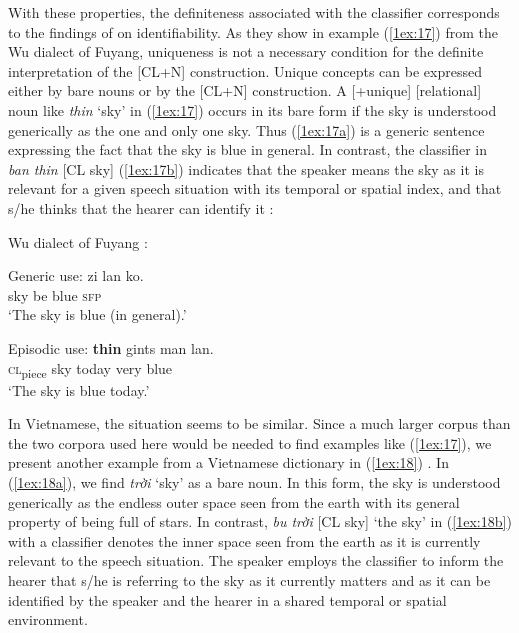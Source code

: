 \documentclass[output=paper]{langsci/langscibook}
\begin{document}
With these properties, the definiteness associated with the classifier corresponds to the findings of \cite[][17]{li:bisang:12} on identifiability. As they show in example (\ref{1ex:17}) from the Wu dialect of Fuyang, uniqueness is not a necessary condition for the definite interpretation of the [CL+N] construction. Unique concepts can be expressed either by bare nouns or by the [CL+N] construction. A [+unique] [\minus relational] noun like {\emph{thin}} `sky' in (\ref{1ex:17}) occurs in its bare form if the sky is understood generically as the one and only one sky. Thus (\ref{1ex:17a}) is a generic sentence expressing the fact that the sky is blue in general. In contrast, the classifier in {\emph{ban thin}} [CL sky] (\ref{1ex:17b}) indicates that the speaker means the sky as it is relevant for a given speech situation with its temporal or spatial index, and that s/he thinks that the hearer can identify it \citep[][17]{li:bisang:12}:

\newpage
\begin{exe}
\ex\label{1ex:17}
Wu dialect of Fuyang \citep[][17]{li:bisang:12}:
\begin{xlista}
\ex\label{1ex:17a}
Generic use:
\exi{}
  zi   lan     ko. \\
    sky    be  blue   {\textsc{sfp}} \\
\glt `The sky is blue (in general).'


\ex\label{1ex:17b}
Episodic use:
\exi{}
         {\textbf{thin}}    gints{\textbf{\textopeno}}   man   lan.  \\
    {\textsc{cl}}\textsubscript{piece}  sky     today    very   blue   \\
\glt `The sky is blue today.'
\end{xlista}
\end{exe}

In Vietnamese, the situation seems to be similar. Since a much larger corpus than the two corpora used here would be needed to find examples like (\ref{1ex:17}), we present another example from a Vietnamese dictionary in (\ref{1ex:18}) \citep[][116 and 1686]{nguyen:05}. In (\ref{1ex:18a}), we find {\emph{trời}} `sky' as a bare noun. In this form, the sky is understood generically as the endless outer space seen from the earth with its general property of being full of stars. In contrast, {\emph{b{\daab}u trời}} [CL sky] `the sky' in (\ref{1ex:18b}) with a classifier denotes the inner space seen from the earth as it is currently relevant to the speech situation. The speaker employs the classifier to inform the hearer that s/he is referring to the sky as it currently matters and as it can be identified by the speaker and the hearer in a shared temporal or spatial environment.
\end{document}
